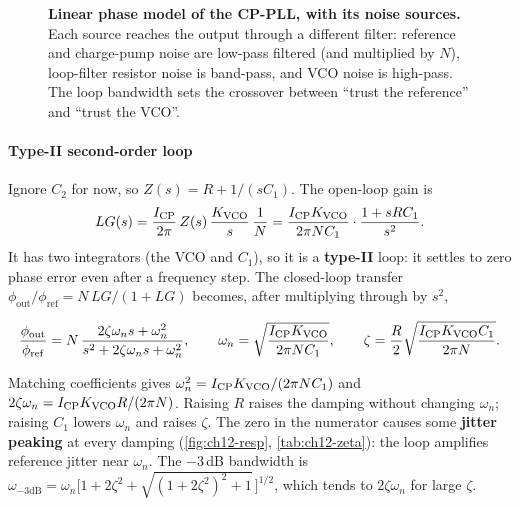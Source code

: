 \begin{figure}[tbp]
\caption{\textbf{Linear phase model of the CP-PLL, with its noise sources.} Each source reaches the output through a different filter: reference and charge-pump noise are low-pass filtered (and multiplied by $N$), loop-filter resistor noise is band-pass, and VCO noise is high-pass. The loop bandwidth sets the crossover between ``trust the reference'' and ``trust the VCO''.}
\label{fig:ch12-linmodel}
\end{figure}

\paragraph{Type-II second-order loop} Ignore $C_2$ for now, so $Z(s) = R + 1/(sC_1)$. The open-loop gain is
\[
  LG(s) = \frac{I_\mathrm{CP}}{2\pi}\,Z(s)\,\frac{K_\mathrm{VCO}}{s}\,\frac1N = \frac{I_\mathrm{CP}K_\mathrm{VCO}}{2\pi N C_1}\cdot\frac{1 + sRC_1}{s^2} .
\]
It has two integrators (the VCO and $C_1$), so it is a \textbf{type-II} loop: it settles to zero phase error even after a frequency step. The closed-loop transfer $\phi_\mathrm{out}/\phi_\mathrm{ref} = N\,LG/(1+LG)$ becomes, after multiplying through by $s^2$,
\begin{keyeq}
\begin{equation}
  \frac{\phi_\mathrm{out}}{\phi_\mathrm{ref}} = N\,\frac{2\zeta\omega_n s + \omega_n^2}{s^2 + 2\zeta\omega_n s + \omega_n^2},
  \qquad
  \omega_n = \sqrt{\frac{I_\mathrm{CP}K_\mathrm{VCO}}{2\pi N C_1}}, \qquad
  \zeta = \frac{R}{2}\sqrt{\frac{I_\mathrm{CP}K_\mathrm{VCO} C_1}{2\pi N}} .
  \label{eq:ch12-wnz}
\end{equation}
\end{keyeq}
Matching coefficients gives $\omega_n^2 = I_\mathrm{CP}K_\mathrm{VCO}/(2\pi N C_1)$ and $2\zeta\omega_n = I_\mathrm{CP}K_\mathrm{VCO} R/(2\pi N)$. Raising $R$ raises the damping without changing $\omega_n$; raising $C_1$ lowers $\omega_n$ and raises $\zeta$. The zero in the numerator causes some \textbf{jitter peaking} at every damping (\cref{fig:ch12-resp}, \cref{tab:ch12-zeta}): the loop amplifies reference jitter near $\omega_n$. The $-3$\,dB bandwidth is $\omega_{-3\mathrm{dB}} = \omega_n\big[1 + 2\zeta^2 + \sqrt{(1+2\zeta^2)^2 + 1}\,\big]^{1/2}$, which tends to $2\zeta\omega_n$ for large $\zeta$.

